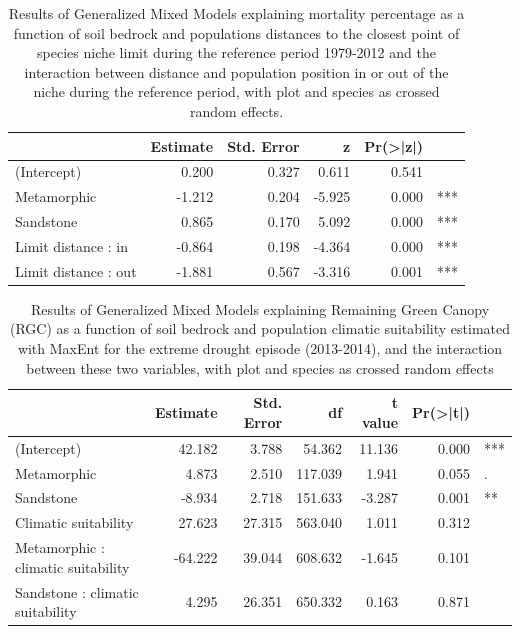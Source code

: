 \documentclass[11pt,twoside]{reedthesis}
\begin{document}
\begin{table}[H]

\caption[Results of Generalized Mixed Models explaining mortality percentage as a function ofdistances to species niche limit.]{\label{tab:unnamed-chunk-30}Results of Generalized Mixed Models explaining mortality percentage as a function of soil bedrock and populations distances to the closest point of species niche limit during the reference period 1979-2012 and the interaction between distance and population position in or out of the niche during the reference period, with plot and species as crossed random effects.}
\centering
\fontsize{8}{10}\selectfont
\begin{tabular}[t]{lrrrrl}
\toprule
 & Estimate & Std. Error & z & Pr(>|z|) & \\
\midrule
(Intercept) & 0.200 & 0.327 & 0.611 & 0.541 & \\
Metamorphic & -1.212 & 0.204 & -5.925 & 0.000 & ***\\
Sandstone & 0.865 & 0.170 & 5.092 & 0.000 & ***\\
Limit distance : in & -0.864 & 0.198 & -4.364 & 0.000 & ***\\
Limit distance : out & -1.881 & 0.567 & -3.316 & 0.001 & ***\\
\bottomrule
\end{tabular}
\end{table}
\begin{table}[H]

\caption[Results of Generalized Mixed Models explaining Remaining Green Canopy (RGC) as a function of soil bedrock and population climatic suitability for the extreme drought episode (2013-2014)]{\label{tab:unnamed-chunk-31}Results of Generalized Mixed Models explaining Remaining Green Canopy (RGC) as a function of soil bedrock and population climatic suitability estimated with MaxEnt for the extreme drought episode (2013-2014), and the interaction between these two variables, with plot and species as crossed random effects}
\centering
\fontsize{7}{9}\selectfont
\begin{tabular}[t]{lrrrrrl}
\toprule
 & Estimate & Std. Error & df & t value & Pr(>|t|) & \\
\midrule
(Intercept) & 42.182 & 3.788 & 54.362 & 11.136 & 0.000 & ***\\
Metamorphic & 4.873 & 2.510 & 117.039 & 1.941 & 0.055 & .\\
Sandstone & -8.934 & 2.718 & 151.633 & -3.287 & 0.001 & **\\
Climatic suitability & 27.623 & 27.315 & 563.040 & 1.011 & 0.312 & \\
Metamorphic : climatic suitability & -64.222 & 39.044 & 608.632 & -1.645 & 0.101 & \\
Sandstone : climatic suitability & 4.295 & 26.351 & 650.332 & 0.163 & 0.871 & \\
\bottomrule
\end{tabular}
\end{table}
\end{document}
